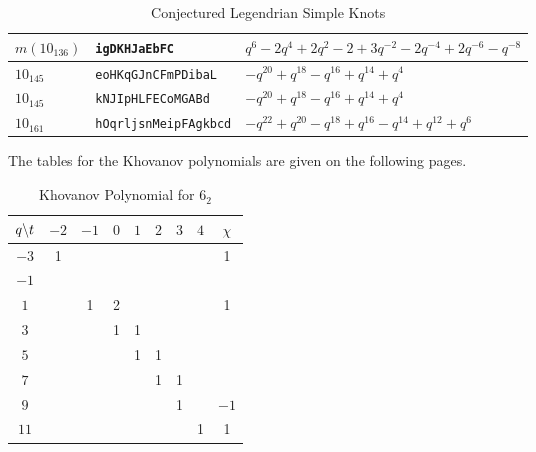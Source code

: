 \begin{table}
{\begin{tabular}{| l | l | l |}
                \hline
                $m(10_{136})$&\texttt{igDKHJaEbFC}&$q^{6}-2q^{4}+2q^{2}-2+3q^{-2}-2q^{-4}+2q^{-6}-q^{-8}$\\
                \hline
                $10_{145}$&\texttt{eoHKqGJnCFmPDibaL}&$-q^{20}+q^{18}-q^{16}+q^{14}+q^{4}$\\
                \hline
                $10_{145}$&\texttt{kNJIpHLFECoMGABd}&$-q^{20}+q^{18}-q^{16}+q^{14}+q^{4}$\\
                \hline
                $10_{161}$&\texttt{hOqrljsnMeipFAgkbcd}&$-q^{22}+q^{20}-q^{18}+q^{16}-q^{14}+q^{12}+q^{6}$\\
                \hline
            \end{tabular}%
        }
        \caption{Conjectured Legendrian Simple Knots}
        \label{fig:conj_leg_simp_knots}
    \end{table}
    The tables for the Khovanov polynomials are given
    on the following pages.
    \newpage
    \begin{table}
        \centering
        \begin{tabular}{| c | c | c | c | c | c | c | c | c |}
            \hline
            $q\symbol{92}t$&$-2$&$-1$&$0$&$1$&$2$&$3$&$4$&$\chi$\\
            \hline
            $-3$&1&&&&&&&1\\
            \hline
            $-1$&&&&&&&&\\
            \hline
            $1$&&1&2&&&&&1\\
            \hline
            $3$&&&1&1&&&&\\
            \hline
            $5$&&&&1&1&&&\\
            \hline
            $7$&&&&&1&1&&\\
            \hline
            $9$&&&&&&1&&$-1$\\
            \hline
            $11$&&&&&&&1&1\\
            \hline
        \end{tabular}
        \caption{Khovanov Polynomial for $6_{2}$}
    \end{table}
